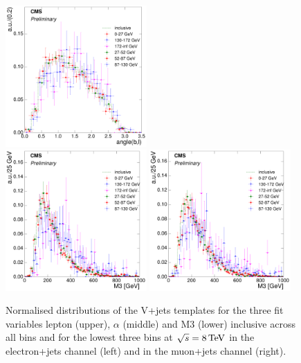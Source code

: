 \begin{figure}[hbtp]
     \includegraphics[width=0.48\textwidth]{Chapters/04_Analysis/04b_XSections/images/8TeV/fit_variables/muon/MET/angle_bl/vjets/MET_angle_bl_2orMoreBtags_VJets_template_comparison.pdf}\\
     \includegraphics[width=0.48\textwidth]{Chapters/04_Analysis/04b_XSections/images/8TeV/fit_variables/electron/MET/M3/vjets/MET_M3_2orMoreBtags_VJets_template_comparison.pdf}\hfill
     \includegraphics[width=0.48\textwidth]{Chapters/04_Analysis/04b_XSections/images/8TeV/fit_variables/muon/MET/M3/vjets/MET_M3_2orMoreBtags_VJets_template_comparison.pdf}\\
	 \caption[Normalised distributions of the V+jets templates for the three fit variables in \met
	 bins.]{Normalised distributions of the V+jets templates for the three fit variables lepton \abseta (upper),
	 $\alpha$ (middle) and M3 (lower) inclusive across all \met bins and for the lowest three \met bins at
	 $\sqrt{s}=8\,\text{Te\hspace{-.08em}V}$ in the electron+jets channel (left) and in the muon+jets channel (right).}
     \label{fig:MET_fit_variable_vjets_comparisons_8TeV}
\end{figure}

